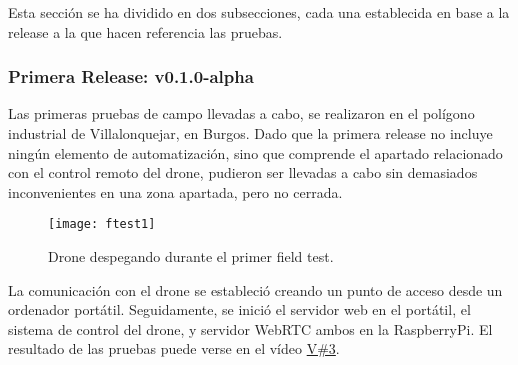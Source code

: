 Esta sección se ha dividido en dos subsecciones, cada una establecida en base a la release a la que hacen referencia las pruebas. 


\subsubsection{Primera Release: v0.1.0-alpha}
\label{subsec:fieldTestingv1}

Las primeras pruebas de campo llevadas a cabo, se realizaron en el polígono industrial de Villalonquejar, en Burgos. 
Dado que la primera release no incluye ningún elemento de automatización, sino que comprende el apartado relacionado con el control remoto del drone, pudieron ser llevadas a cabo sin demasiados inconvenientes en una zona apartada, pero no cerrada. 

\begin{figure}[H]
	\centering
	\texttt{[image: ftest1]}
	\caption[Field Test 1. Villalonquejar]{Drone despegando durante el primer field test.}\label{fig:ftest1Drone}
\end{figure}

La comunicación con el drone se estableció creando un punto de acceso desde un ordenador portátil. Seguidamente, se inició el servidor web en el portátil, el sistema de control del drone, y servidor WebRTC ambos en la RaspberryPi. El resultado de las pruebas puede verse en el vídeo \href{https://universidaddeburgos-my.sharepoint.com/:v:/g/personal/mbm0089_alu_ubu_es/ERit03PQ4GVJvVXNLCxQQwUBUjZt6VjCwl5GcLUYwFQGPQ?e=dD258g}{V\#3}.

